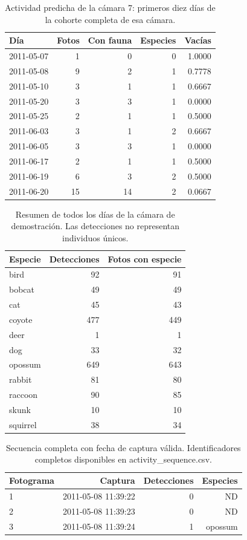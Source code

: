 \begin{table}[H]
\centering\small
\caption{Actividad predicha de la cámara 7: primeros diez días de la cohorte completa de esa cámara.}
\begin{tabular}{lrrrr}
\toprule
Día & Fotos & Con fauna & Especies & Vacías \\
\midrule
2011-05-07 & 1 & 0 & 0 & 1.0000 \\
2011-05-08 & 9 & 2 & 1 & 0.7778 \\
2011-05-10 & 3 & 1 & 1 & 0.6667 \\
2011-05-20 & 3 & 3 & 1 & 0.0000 \\
2011-05-25 & 2 & 1 & 1 & 0.5000 \\
2011-06-03 & 3 & 1 & 2 & 0.6667 \\
2011-06-05 & 3 & 3 & 1 & 0.0000 \\
2011-06-17 & 2 & 1 & 1 & 0.5000 \\
2011-06-19 & 6 & 3 & 2 & 0.5000 \\
2011-06-20 & 15 & 14 & 2 & 0.0667 \\
\bottomrule
\end{tabular}
\end{table}

\begin{table}[H]
\centering\small
\caption{Resumen de todos los días de la cámara de demostración. Las detecciones no representan individuos únicos.}
\begin{tabular}{lrr}
\toprule
Especie & Detecciones & Fotos con especie \\
\midrule
bird & 92 & 91 \\
bobcat & 49 & 49 \\
cat & 45 & 43 \\
coyote & 477 & 449 \\
deer & 1 & 1 \\
dog & 33 & 32 \\
opossum & 649 & 643 \\
rabbit & 81 & 80 \\
raccoon & 90 & 85 \\
skunk & 10 & 10 \\
squirrel & 38 & 34 \\
\bottomrule
\end{tabular}
\end{table}

\begin{table}[H]
\centering\small
\caption{Secuencia completa con fecha de captura válida. Identificadores completos disponibles en activity\_sequence.csv.}
\begin{tabular}{lrrr}
\toprule
Fotograma & Captura & Detecciones & Especies \\
\midrule
1 & 2011-05-08 11:39:22 & 0 & ND \\
2 & 2011-05-08 11:39:23 & 0 & ND \\
3 & 2011-05-08 11:39:24 & 1 & opossum \\
\bottomrule
\end{tabular}
\end{table}
